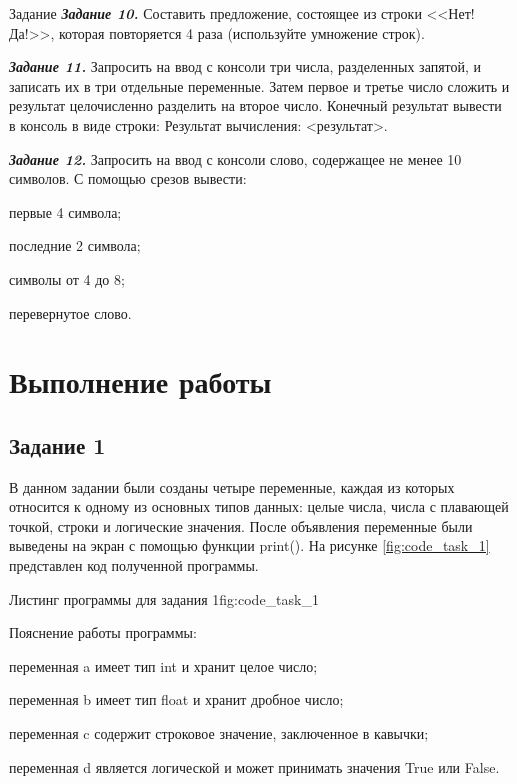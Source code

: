 \documentclass[]{vvsu}
\begin{document}
\begin{addition}{Задание}
  \textit{\textbf{Задание 10.}}  
  Составить предложение, состоящее из строки <<Нет! Да!>>, которая повторяется 4 раза (используйте умножение строк).

  \textit{\textbf{Задание 11.}}  
  Запросить на ввод с консоли три числа, разделенных запятой,  
  и записать их в три отдельные переменные.  
  Затем первое и третье число сложить и результат целочисленно разделить на второе число.  
  Конечный результат вывести в консоль в виде строки:  
  Результат вычисления: <результат>.

  \textit{\textbf{Задание 12.}}  
  Запросить на ввод с консоли слово, содержащее не менее 10 символов.  
  С помощью срезов вывести:
  \begin{vvsu_list}
    \item первые 4 символа;
    \item последние 2 символа;
    \item символы от 4 до 8;
    \item перевернутое слово.
  \end{vvsu_list}
\end{addition}

\toc

\section{Выполнение работы}

\subsection{Задание 1}

В данном задании были созданы четыре переменные, каждая из которых относится к одному из основных типов данных: целые числа, числа с плавающей точкой, строки и логические значения. После объявления переменные были выведены на экран с помощью функции print(). На рисунке \ref{fig:code_task_1} представлен код полученной программы.

\begin{vvsu_figure}{Листинг программы для задания 1}{fig:code_task_1}
  \begin{minipage}{.75\textwidth}
    
  \end{minipage}
\end{vvsu_figure}

Пояснение работы программы:
\begin{vvsu_list}
  \item переменная a имеет тип int и хранит целое число;
  \item переменная b имеет тип float и хранит дробное число;
  \item переменная c содержит строковое значение, заключенное в кавычки;
  \item переменная d является логической и может принимать значения True или False.
\end{vvsu_list}
\end{document}
